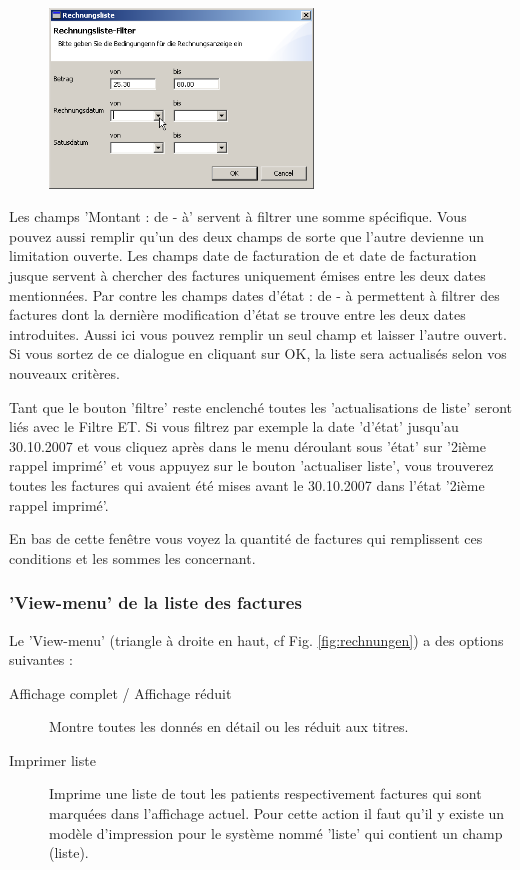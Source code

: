 \begin{figure}
\includegraphics[width=7cm]{images/rechnungsfilter}
\end{figure}
Les champs 'Montant : de  - à' servent à filtrer une somme spécifique. Vous pouvez aussi remplir qu'un des deux champs de sorte que l'autre devienne un limitation ouverte.
 Les champs \glqq date de facturation de\grqq{} et \glqq date de facturation jusque\grqq{} servent à chercher des factures uniquement émises entre les deux dates mentionnées. Par contre les champs  \glqq dates d'état : de - à\grqq{} permettent à filtrer des factures dont la dernière modification d'état se trouve entre les deux dates introduites. Aussi ici vous pouvez remplir un seul champ et laisser l'autre ouvert. 
 Si vous sortez de ce dialogue en cliquant sur OK, la liste sera actualisés selon vos nouveaux critères.

\medskip

Tant que le bouton 'filtre' reste enclenché toutes les 'actualisations de liste' seront liés avec le Filtre ET. Si vous filtrez par exemple la date 'd'état' jusqu'au 30.10.2007 et vous cliquez après dans le menu déroulant sous 'état' sur '2ième rappel imprimé' et vous appuyez sur le bouton 'actualiser liste', vous trouverez toutes les factures qui avaient été mises avant le 30.10.2007 dans l'état '2ième rappel imprimé'. 

En bas de cette fenêtre vous voyez la quantité de factures qui remplissent ces conditions et les sommes les concernant.

\subsubsection{'View-menu' de la liste des factures}
Le 'View-menu' (triangle à droite en haut, cf Fig. \ref{fig:rechnungen}) a des options suivantes :
\begin{description}
\item [Affichage complet / Affichage réduit ] Montre toutes les donnés en détail ou les réduit aux titres.
\item [Imprimer liste ] Imprime une liste de tout les patients respectivement factures qui sont marquées dans l'affichage actuel. Pour cette action il faut qu'il y existe un modèle d'impression pour le système nommé 'liste' qui contient un champ (liste).
\end{description}
